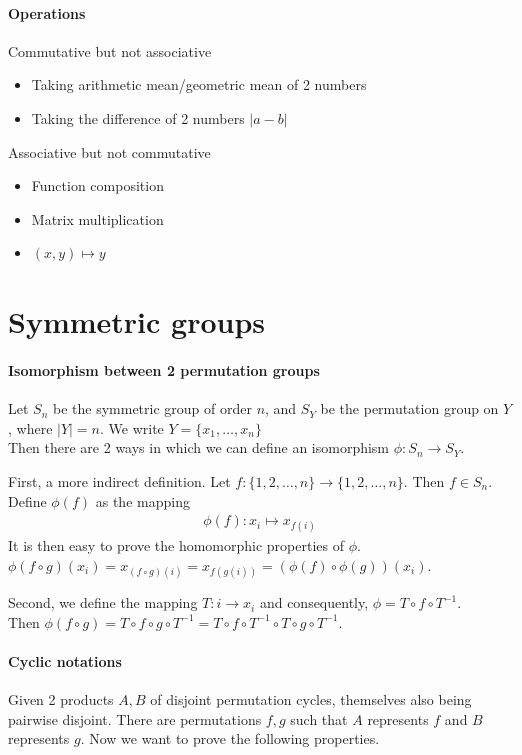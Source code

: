 \documentclass{article}
\begin{document}
\paragraph{Operations}\mbox{}
Commutative but not associative
\begin{itemize}
	\item Taking arithmetic mean/geometric mean of 2 numbers
	\item Taking the difference of 2 numbers $|a-b|$
\end{itemize}

Associative but not commutative
\begin{itemize}
	\item Function composition
	\item Matrix multiplication
	\item $(x,y)\mapsto y$
\end{itemize}

\section{Symmetric groups}
\paragraph{Isomorphism between 2 permutation groups}
Let $S_n$ be the symmetric group of order $n$, and $S_Y$ be the permutation group on $Y$, where $|Y|=n$. We write $Y=\{x_1,\dots, x_n\}$\\
Then there are 2 ways in which we can define an isomorphism $\phi:S_n\rightarrow S_Y$.

First, a more indirect definition. Let $f:\{1,2,\dots, n\}\rightarrow \{1,2,\dots, n\}$. Then $f\in S_n$. Define $\phi(f)$ as the mapping 
\begin{align*}
	\phi(f): x_i \mapsto x_{f(i)}
\end{align*}
It is then easy to prove the homomorphic properties of $\phi$. $\phi(f\circ g)(x_i) = x_{(f\circ g)(i)} = x_{f(g(i))} = (\phi(f)\circ \phi(g))(x_i)$.

Second, we define the mapping $T: i\rightarrow x_i$ and consequently, $\phi = T\circ f\circ T^{-1}$.\\
Then $\phi(f\circ g) = T\circ f\circ g\circ T^{-1} = T\circ f\circ T^{-1}\circ T\circ g\circ T^{-1}$.

\paragraph{Cyclic notations}\mbox{}
Given 2 products $A, B$ of disjoint permutation cycles, themselves also being pairwise disjoint. There are permutations $f,g$ such that $A$ represents $f$ and $B$ represents $g$.
Now we want to prove the following properties.
\end{document}
